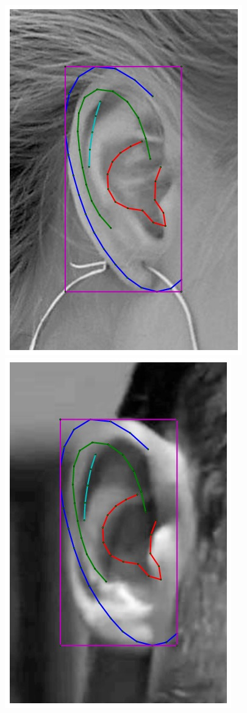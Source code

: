 \begin{figure}
    \hfill
    \includegraphics[height=\flowh]{resources/Ear_Deformable_Model/fittings/initial_0011}
    \hfill
    \includegraphics[height=\flowh]{resources/Ear_Deformable_Model/fittings/initial_0003}

\end{figure}
